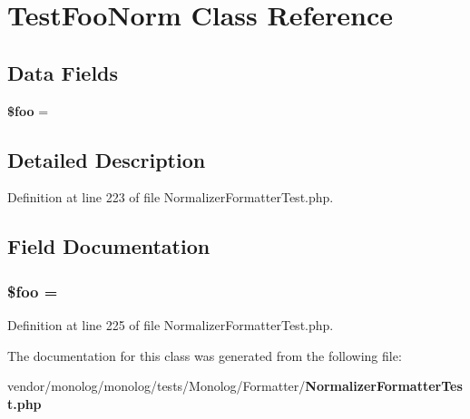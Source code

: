 \section{Test\+Foo\+Norm Class Reference}
\label{class_monolog_1_1_formatter_1_1_test_foo_norm}
\subsection*{Data Fields}
\begin{DoxyCompactItemize}
\item 
{\bf \$foo} = \textquotesingle{}
\end{DoxyCompactItemize}


\subsection{Detailed Description}


Definition at line 223 of file Normalizer\+Formatter\+Test.\+php.



\subsection{Field Documentation}
\subsubsection[{\$foo}]{\setlength{\rightskip}{0pt plus 5cm}\${\bf foo} = \textquotesingle{}}\label{class_monolog_1_1_formatter_1_1_test_foo_norm_a7a1efa8a0f6183fb3a5e8e8b0696526c}


Definition at line 225 of file Normalizer\+Formatter\+Test.\+php.



The documentation for this class was generated from the following file\+:\begin{DoxyCompactItemize}
\item 
vendor/monolog/monolog/tests/\+Monolog/\+Formatter/{\bf Normalizer\+Formatter\+Test.\+php}\end{DoxyCompactItemize}
